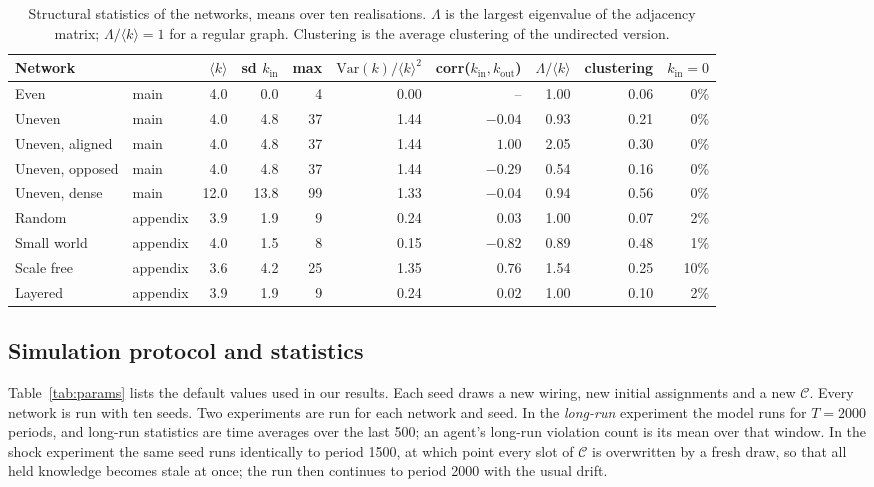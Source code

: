 \documentclass[11pt]{article}
\begin{document}
\begin{table}[H]
\centering
\caption{Structural statistics of the networks, means over ten realisations. $\Lambda$ is the largest eigenvalue of the adjacency matrix; $\Lambda/\langle k\rangle = 1$ for a regular graph. Clustering is the average clustering of the undirected version.}
\label{tab:networks}
\footnotesize
\begin{tabular}{@{}llrrrrrrrr@{}}
\toprule
Network & & $\langle k\rangle$ & sd $k_{\mathrm{in}}$ & max & $\mathrm{Var}(k)/\langle k\rangle^2$ & corr($k_{\mathrm{in}},k_{\mathrm{out}}$) & $\Lambda/\langle k\rangle$ & clustering & $k_{\mathrm{in}}=0$ \\
\midrule
Even        & main & 4.0  & 0.0  & 4  & 0.00 & --      & 1.00 & 0.06 & 0\% \\
Uneven      & main & 4.0  & 4.8  & 37 & 1.44 & $-0.04$ & 0.93 & 0.21 & 0\% \\
Uneven, aligned & main & 4.0 & 4.8 & 37 & 1.44 & $1.00$ & 2.05 & 0.30 & 0\% \\
Uneven, opposed & main & 4.0 & 4.8 & 37 & 1.44 & $-0.29$ & 0.54 & 0.16 & 0\% \\
Uneven, dense & main & 12.0 & 13.8 & 99 & 1.33 & $-0.04$ & 0.94 & 0.56 & 0\% \\
Random      & appendix & 3.9 & 1.9 & 9  & 0.24 & $0.03$  & 1.00 & 0.07 & 2\% \\
Small world & appendix & 4.0 & 1.5 & 8  & 0.15 & $-0.82$ & 0.89 & 0.48 & 1\% \\
Scale free  & appendix & 3.6 & 4.2 & 25 & 1.35 & $0.76$  & 1.54 & 0.25 & 10\% \\
Layered     & appendix & 3.9 & 1.9 & 9  & 0.24 & $0.02$  & 1.00 & 0.10 & 2\% \\
\bottomrule
\end{tabular}
\end{table}

\subsection{Simulation protocol and statistics}

Table~\ref{tab:params} lists the default values used in our results. Each seed draws a new wiring, new initial assignments and a new $\mathcal{C}$. Every network is run with ten seeds. Two experiments are run for each network and seed. In the \emph{long-run} experiment the model runs for $T = 2000$ periods, and long-run statistics are time averages over the last 500; an agent's long-run violation count is its mean over that window. In the shock experiment the same seed runs identically to period 1500, at which point every slot of $\mathcal{C}$ is overwritten by a fresh draw, so that all held knowledge becomes stale at once; the run then continues to period 2000 with the usual drift.
\end{document}
